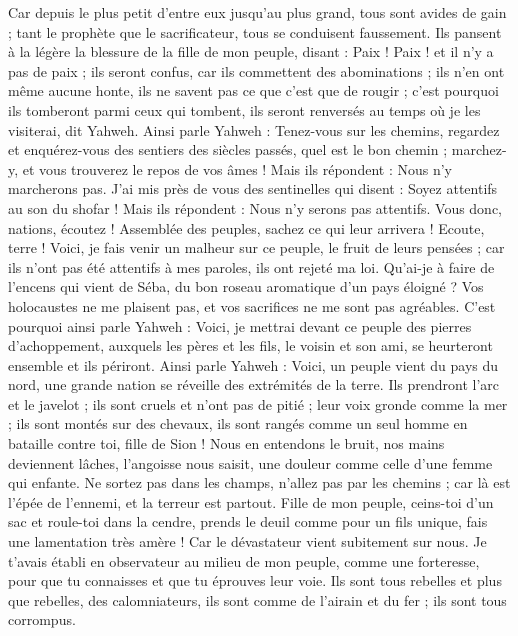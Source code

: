 \begin{multicols}{2}
Car depuis le plus petit d'entre eux jusqu'au plus grand, tous sont avides de gain ; tant le prophète que le sacrificateur, tous se conduisent faussement.
Ils pansent à la légère la blessure de la fille de mon peuple, disant : Paix ! Paix ! et il n'y a pas de paix ;
ils seront confus, car ils commettent des abominations ; ils n'en ont même aucune honte, ils ne savent pas ce que c'est que de rougir ; c'est pourquoi ils tomberont parmi ceux qui tombent, ils seront renversés au temps où je les visiterai, dit Yahweh.
Ainsi parle Yahweh : Tenez-vous sur les chemins, regardez et enquérez-vous des sentiers des siècles passés, quel est le bon chemin ; marchez-y, et vous trouverez le repos de vos âmes ! Mais ils répondent : Nous n'y marcherons pas.
J'ai mis près de vous des sentinelles qui disent : Soyez attentifs au son du shofar ! Mais ils répondent : Nous n'y serons pas attentifs.
Vous donc, nations, écoutez ! Assemblée des peuples, sachez ce qui leur arrivera !
Ecoute, terre ! Voici, je fais venir un malheur sur ce peuple, le fruit de leurs pensées ; car ils n'ont pas été attentifs à mes paroles, ils ont rejeté ma loi.
Qu'ai-je à faire de l'encens qui vient de Séba, du bon roseau aromatique d'un pays éloigné ? Vos holocaustes ne me plaisent pas, et vos sacrifices ne me sont pas agréables.
C'est pourquoi ainsi parle Yahweh : Voici, je mettrai devant ce peuple des pierres d'achoppement, auxquels les pères et les fils, le voisin et son ami, se heurteront ensemble et ils périront.
Ainsi parle Yahweh : Voici, un peuple vient du pays du nord, une grande nation se réveille des extrémités de la terre.
Ils prendront l'arc et le javelot ; ils sont cruels et n'ont pas de pitié ; leur voix gronde comme la mer ; ils sont montés sur des chevaux, ils sont rangés comme un seul homme en bataille contre toi, fille de Sion !
Nous en entendons le bruit, nos mains deviennent lâches, l'angoisse nous saisit, une douleur comme celle d'une femme qui enfante.
Ne sortez pas dans les champs, n'allez pas par les chemins ; car là est l'épée de l'ennemi, et la terreur est partout.
Fille de mon peuple, ceins-toi d'un sac et roule-toi dans la cendre, prends le deuil comme pour un fils unique, fais une lamentation très amère ! Car le dévastateur vient subitement sur nous.
Je t'avais établi en observateur au milieu de mon peuple, comme une forteresse, pour que tu connaisses et que tu éprouves leur voie.
Ils sont tous rebelles et plus que rebelles, des calomniateurs, ils sont comme de l'airain et du fer ; ils sont tous corrompus.

\end{multicols}

